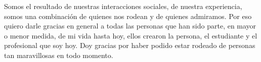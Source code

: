 \begin{acknowledgements}
Somos el resultado de nuestras interacciones sociales, de nuestra experiencia, somos una combinación de quienes nos rodean y de quienes admiramos.
Por eso quiero darle gracias en general a todas las personas que han sido parte, en mayor o menor medida, de mi vida hasta hoy, ellos crearon la persona, el estudiante y el profesional que soy hoy.
Doy gracias por haber podido estar rodeado de personas tan maravillosas en todo momento.

\end{acknowledgements}
